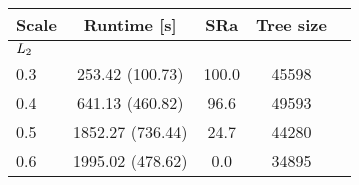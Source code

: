 \begin{tabular}{lcccc}
\toprule
{\bf Scale} & {\bf Runtime [s] } & {\bf SRa} & {\bf Tree size}\\ 
\midrule
\multicolumn{2}{l}{$ L_2 $} \\ 
0.3 & 253.42 (100.73) & 100.0  & 45598  \\
0.4 & 641.13 (460.82) & 96.6  & 49593  \\
0.5 & 1852.27 (736.44) & 24.7  & 44280  \\
0.6 & 1995.02 (478.62) & 0.0  & 34895  \\
\bottomrule
\end{tabular}
